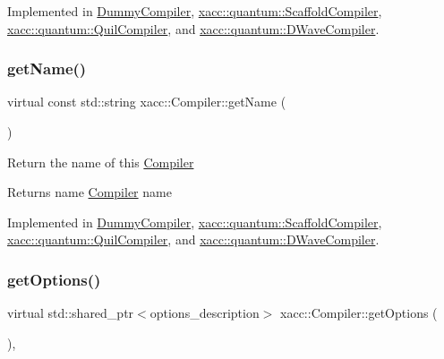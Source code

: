 Implemented in \hyperlink{a02500_a40d7cc3bbc72a2ce9362136b3b83245c}{Dummy\+Compiler}, \hyperlink{a01236_a3736ecc229fe6acdd4c991e85d7a1f08}{xacc\+::quantum\+::\+Scaffold\+Compiler}, \hyperlink{a01204_adf4d321ecb0df3fa7728999f941c83b2}{xacc\+::quantum\+::\+Quil\+Compiler}, and \hyperlink{a01252_a893e1d1c81a8aaf6e2435c9bceab575e}{xacc\+::quantum\+::\+D\+Wave\+Compiler}.

\mbox{\label{a02448_a87fca9100e6462122f5b687c3a0fb3fb}} 
\subsubsection{\texorpdfstring{get\+Name()}{getName()}}
{\footnotesize\ttfamily virtual const std\+::string xacc\+::\+Compiler\+::get\+Name (\begin{DoxyParamCaption}{ }\end{DoxyParamCaption})\hspace{0.3cm}{\ttfamily [pure virtual]}}

Return the name of this \hyperlink{a02448}{Compiler} \begin{DoxyReturn}{Returns}
name \hyperlink{a02448}{Compiler} name 
\end{DoxyReturn}


Implemented in \hyperlink{a02500_a76460cb78671dc2cf42f2bebf8fb80c7}{Dummy\+Compiler}, \hyperlink{a01236_a3f537054a3924a1d14f4ceb0f0181161}{xacc\+::quantum\+::\+Scaffold\+Compiler}, \hyperlink{a01204_ae7d52140b6dd52730edc6e38ae48f437}{xacc\+::quantum\+::\+Quil\+Compiler}, and \hyperlink{a01252_a8a180031ae563e1a9aac611e8066c181}{xacc\+::quantum\+::\+D\+Wave\+Compiler}.

\mbox{\label{a02448_a9f5a8965c9c2dd895016d18264ebbe92}} 
\subsubsection{\texorpdfstring{get\+Options()}{getOptions()}}
{\footnotesize\ttfamily virtual std\+::shared\+\_\+ptr$<$options\+\_\+description$>$ xacc\+::\+Compiler\+::get\+Options (\begin{DoxyParamCaption}{ }\end{DoxyParamCaption})\hspace{0.3cm}{\ttfamily [inline]}, {\ttfamily [virtual]}}

